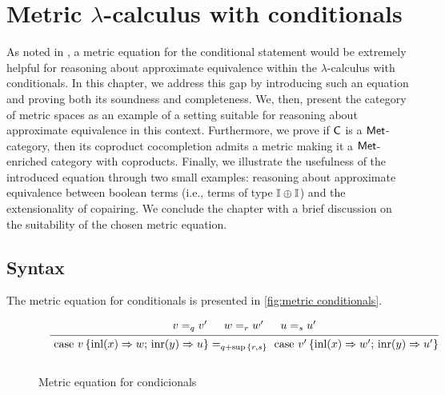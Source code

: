 \chapter{Metric $\lambda$-calculus with conditionals} \label{ch:conditionals}

As noted in , a metric equation for the conditional statement would be extremely helpful for reasoning about approximate equivalence within the $\lambda$-calculus with conditionals. In this chapter, we address this gap by introducing such an equation and proving both its soundness and completeness. 
We, then,  present the category of metric spaces as an example of a setting suitable for reasoning about approximate equivalence in this context. Furthermore, we prove if $\mathsf{C}$ is a $\mathsf{Met}$-category, then its coproduct cocompletion admits a metric making it a $\mathsf{Met}$-enriched category with coproducts.
Finally, we illustrate the usefulness of the introduced equation through two small examples: reasoning about approximate equivalence between boolean terms (i.e., terms of type $\mathbb{I} \oplus \mathbb{I}$) and the extensionality of copairing. We conclude the chapter with a brief discussion on the suitability of the chosen metric equation.






\section{Syntax}

The metric equation for conditionals is presented in \autoref{fig:metric conditionals}. 

\begin{figure}[H]
  \begin{equation*}
  \begin{aligned}
  &
  &
  \begin{prooftree}
      \hypo{ v =_{q} v' }
      \hypo{w=_{r} w'}
      \hypo{u=_{s}u'}
      \infer3[]{\text{ case } v \,   \{\text{inl} (x) \Rightarrow w ; \, \text{inr} (y) \Rightarrow u\} =_{q+\sup{\{ r, s \}}} \text{ case } v' \,  \{\text{inl} (x) \Rightarrow w' ; \,\text{inr} (y) \Rightarrow u'\} }
  \end{prooftree}
  \\[10pt]
  \end{aligned}
  \end{equation*}
  \caption{Metric equation for condicionals}
  \label{fig:metric conditionals}
\end{figure}


